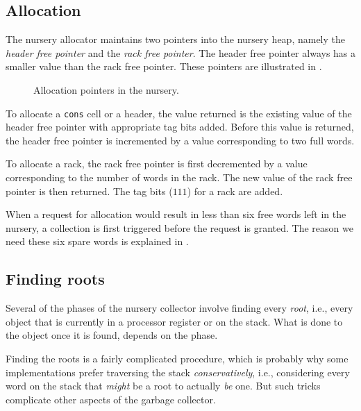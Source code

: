 \subsection{Allocation}

The nursery allocator maintains two pointers into the nursery heap,
namely the \emph{header free pointer} and the \emph{rack free
  pointer}.  The header free pointer always has a smaller value than
the rack free pointer.  These pointers are illustrated in
.

\begin{figure}
\begin{center}
\end{center}
\caption{\label{fig-nursery-pointers}
Allocation pointers in the nursery.}
\end{figure}

To allocate a \texttt{cons} cell or a header, the value returned is
the existing value of the header free pointer with appropriate tag
bits added.  Before this value is returned, the header free pointer is
incremented by a value corresponding to two full words.

To allocate a rack, the rack free pointer is first decremented by a
value corresponding to the number of words in the rack.  The new value
of the rack free pointer is then returned.  The tag bits ($111$) for a
rack are added.

When a request for allocation would result in less than six free words
left in the nursery, a collection is first triggered before the
request is granted.  The reason we need these six spare words is
explained in .

\subsection{Finding roots}
\label{sec-garbage-collection-finding-roots}

Several of the phases of the nursery collector involve finding every
\emph{root}, i.e., every \commonlisp{} object that is currently in a
processor register or on the stack.  What is done to the object once
it is found, depends on the phase.

Finding the roots is a fairly complicated procedure, which is probably
why some implementations prefer traversing the stack
\emph{conservatively}, i.e., considering every word on the stack that
\emph{might} be a root to actually \emph{be} one.  But such tricks
complicate other aspects of the garbage collector.

